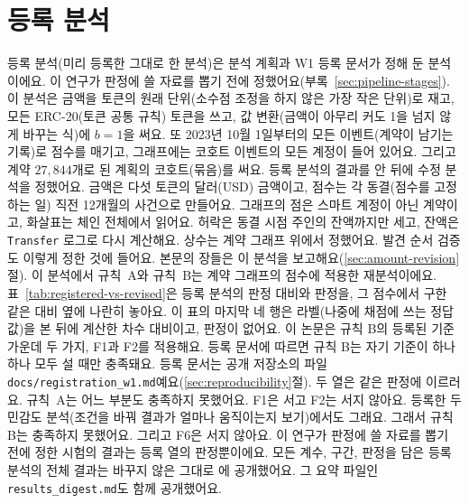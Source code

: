 \section{등록 분석}
\label{sec:map-registered}



등록 분석(미리 등록한 그대로 한 분석)은 분석 계획과 W1 등록 문서가 정해 둔 분석이에요. 이 연구가 판정에 쓸 자료를 뽑기 전에 정했어요(부록~\ref{sec:pipeline-stages}). 이 분석은 금액을 토큰의 원래 단위(소수점 조정을 하지 않은 가장 작은 단위)로 재고, 모든 ERC-20(토큰 공통 규칙) 토큰을 쓰고, 값 변환(금액이 아무리 커도 1을 넘지 않게 바꾸는 식)에 $b=1$을 써요. 또 2023년 10월 1일부터의 모든 이벤트(계약이 남기는 기록)로 점수를 매기고, 그래프에는 코호트 이벤트의 모든 계정이 들어 있어요. 그리고 계약 $27{,}844$개로 된 계획의 코호트(묶음)를 써요. 등록 분석의 결과를 안 뒤에 수정 분석을 정했어요. 금액은 다섯 토큰의 달러(USD) 금액이고, 점수는 각 동결(점수를 고정하는 일) 직전 12개월의 사건으로 만들어요. 그래프의 점은 스마트 계정이 아닌 계약이고, 화살표는 체인 전체에서 읽어요. 허락은 동결 시점 주인의 잔액까지만 세고, 잔액은 \texttt{Transfer} 로그로 다시 계산해요. 상수는 계약 그래프 위에서 정했어요. 발견 순서 검증도 이렇게 정한 것에 들어요. 본문의 장들은 이 분석을 보고해요(\ref{sec:amount-revision}절). 이 분석에서 규칙~A와 규칙~B는 계약 그래프의 점수에 적용한 재분석이에요. 표~\ref{tab:registered-vs-revised}은 등록 분석의 판정 대비와 판정을, 그 점수에서 구한 같은 대비 옆에 나란히 놓아요. 이 표의 마지막 네 행은 라벨(나중에 채점에 쓰는 정답 값)을 본 뒤에 계산한 차수 대비이고, 판정이 없어요. 이 논문은 규칙 B의 등록된 기준 가운데 두 가지, F1과 F2를 적용해요. 등록 문서에 따르면 규칙 B는 자기 기준이 하나하나 모두 설 때만 충족돼요. 등록 문서는 공개 저장소의 파일 \texttt{docs/registration\_w1.md}예요(\ref{sec:reproducibility}절). 두 열은 같은 판정에 이르러요. 규칙~A는 어느 부분도 충족하지 못했어요. F1은 서고 F2는 서지 않아요. 등록한 두 민감도 분석(조건을 바꿔 결과가 얼마나 움직이는지 보기)에서도 그래요. 그래서 규칙 B는 충족하지 못했어요. 그리고 F6은 서지 않아요. 이 연구가 판정에 쓸 자료를 뽑기 전에 정한 시험의 결과는 등록 열의 판정뿐이에요. 모든 계수, 구간, 판정을 담은 등록 분석의 전체 결과는 바꾸지 않은 그대로 에 공개했어요. 그 요약 파일인 \texttt{results\_digest.md}도 함께 공개했어요.
